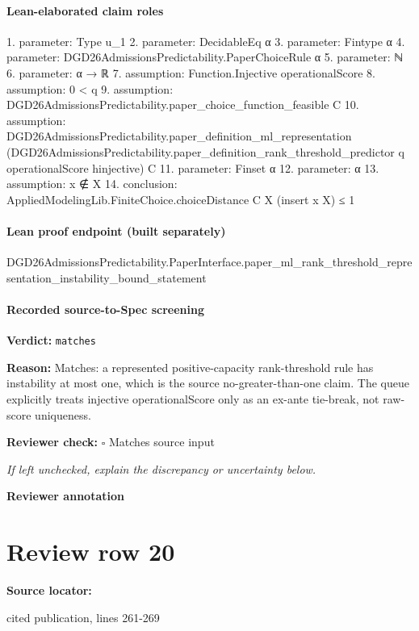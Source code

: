 \documentclass[10pt]{article}
\newcommand{\reviewerbox}{%
  \par\noindent\fbox{\parbox{0.96\linewidth}{\rule{0pt}{0.38in}}}\par
}
\newcommand{\reviewmatch}[1]{%
  \par\noindent\textbf{Reviewer check:} $\square$\; #1\par
  \noindent\emph{If left unchecked, explain the discrepancy or uncertainty below.}\par
}
\begin{document}
\paragraph{Lean-elaborated claim roles}\begin{ReviewVerbatim}
1. parameter: Type u_1
2. parameter: DecidableEq α
3. parameter: Fintype α
4. parameter: DGD26AdmissionsPredictability.PaperChoiceRule α
5. parameter: ℕ
6. parameter: α → ℝ
7. assumption: Function.Injective operationalScore
8. assumption: 0 < q
9. assumption: DGD26AdmissionsPredictability.paper_choice_function_feasible C
10. assumption: DGD26AdmissionsPredictability.paper_definition_ml_representation
  (DGD26AdmissionsPredictability.paper_definition_rank_threshold_predictor q operationalScore hinjective) C
11. parameter: Finset α
12. parameter: α
13. assumption: x ∉ X
14. conclusion: AppliedModelingLib.FiniteChoice.choiceDistance C X (insert x X) ≤ 1
\end{ReviewVerbatim}

\paragraph{Lean proof endpoint (built separately)}\begin{ReviewVerbatim}
DGD26AdmissionsPredictability.PaperInterface.paper_ml_rank_threshold_representation_instability_bound_statement
\end{ReviewVerbatim}

\paragraph{Recorded source-to-Spec screening}
\textbf{Verdict:} \texttt{matches}
\\
{\raggedright
\textbf{Reason:} Matches:\allowbreak{} a represented positive-\allowbreak{}capacity rank-\allowbreak{}threshold rule has instability at most one, which is the source no-\allowbreak{}greater-\allowbreak{}than-\allowbreak{}one claim.\allowbreak{} The queue explicitly treats injective operationalScore only as an ex-\allowbreak{}ante tie-\allowbreak{}break, not raw-\allowbreak{}score uniqueness.\allowbreak{}
\par}
\reviewmatch{Matches source input}
\noindent\textbf{Reviewer annotation}\par
\reviewerbox
\clearpage
\hypertarget{source-claim-98ed151e7543b81d}{}
\section*{Review row 20}
\textbf{Source locator:} {\footnotesize\raggedright cited publication, lines 261-\allowbreak{}269\par}
\end{document}
